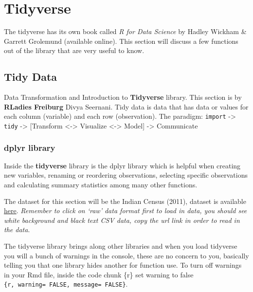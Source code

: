 \documentclass[
]{book}
\theoremstyle{definition}
\theoremstyle{definition}
\theoremstyle{definition}
\theoremstyle{definition}
\theoremstyle{remark}
\begin{document}
\hypertarget{tidyverse}{%
\chapter{Tidyverse}\label{tidyverse}}

The tidyverse has its own book called \emph{R for Data Science} by Hadley Wickham \& Garrett Grolemund (available online). This section will discuss a few functions out of the library that are very useful to know.

\hypertarget{tidy-data}{%
\section{Tidy Data}\label{tidy-data}}

Data Transformation and Introduction to \textbf{Tidyverse} library. This section is by \textbf{RLadies Freiburg} Divya Seernani.
Tidy data is data that has data or values for each column (variable) and each row (observation). The paradigm:
\texttt{import} -\textgreater{} \texttt{tidy} -\textgreater{} {[}Transform \textless-\textgreater{} Visualize \textless-\textgreater{} Model{]} -\textgreater{} Communicate

\hypertarget{dplyr-library}{%
\subsection{dplyr library}\label{dplyr-library}}

Inside the \textbf{tidyverse} library is the dplyr library which is helpful when creating new variables, renaming or reordering observations, selecting specific observations and calculating summary statistics among many other functions.

The dataset for this section will be the Indian Census (2011), dataset is available \href{https://github.com/nishusharma1608/India-Census-2011-Analysis/blob/master/india-districts-census-2011.csv}{here}. \emph{Remember to click on `raw' data format first to load in data, you should see white background and black text CSV data, copy the url link in order to read in the data}.

The tidyverse library brings along other libraries and when you load tidyverse you will a bunch of warnings in the console, these are no concern to you, basically telling you that one library hides another for function use. To turn off warnings in your Rmd file, inside the code chunk \{r\} set warning to false \texttt{\{r,\ warning=\ FALSE,\ message=\ FALSE\}}.
\end{document}
